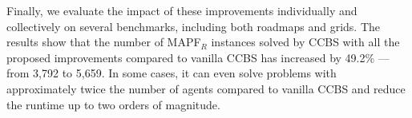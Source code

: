 \documentclass[letterpaper]{article} %
\newcommand\roni[1]{\nb{\textbf{Roni:}}{orange}{#1}}
\newcommand{\ccbs}{\ac{CCBS}\xspace}
\newcommand{\mapfr}{{MAPF}$_R$\xspace}
\newcommand{\mapf}{\ac{MAPF}\xspace}
\newcommand{\ds}{\ac{DS}\xspace}
\begin{document}
Finally, we evaluate the impact of these improvements individually and collectively on several benchmarks, including both roadmaps and grids. 
The results show that the number of \mapfr instances solved by \ccbs with all the proposed improvements compared to vanilla CCBS
has increased by 49.2\% --- from 3,792 to 5,659. 
In some cases, it can even solve problems with approximately twice the number of agents compared to vanilla CCBS and reduce the runtime up to two orders of magnitude.








\end{document}
